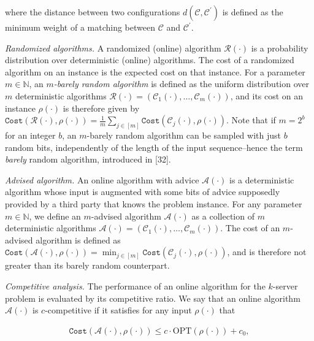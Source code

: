 where the distance between two configurations $d(\mathcal{C},\mathcal{C}^{\prime})$ is defined as the minimum weight of a matching between $\mathcal{C}$ and $\mathcal{C}^{\prime}$.\par




\emph{Randomized algorithms.} A randomized (online) algorithm $\mathcal{R}(\cdot)$ is a probability distribution over deterministic (online) algorithms. The cost of a randomized algorithm on an instance is the expected cost on that instance. For a parameter $m\in\mathbb{N}$, an \emph{$m$-barely random algorithm} is defined as the uniform distribution over $m$ deterministic algorithms $\mathcal{R}(\cdot)=(\mathcal{C}_{1}(\cdot),\dots,\mathcal{C}_{m}(\cdot))$, and its cost on an instance $\rho(\cdot)$ is therefore given by ${\texttt{Cost}}(\mathcal{R}(\cdot),\rho(\cdot))=\frac{1}{m}\sum_{j\in[m]}{\texttt{Cost}}(\mathcal{C}_{j}(\cdot),\rho(\cdot))$. Note that if $m=2^{b}$ for an integer $b$, an $m$-barely random algorithm can be sampled with just $b$ random bits, independently of the length of the input sequence–hence the term \emph{barely} random algorithm, introduced in [32].\par




\emph{Advised algorithm.} An online algorithm with advice $\mathcal{A}(\cdot)$ is a deterministic algorithm whose input is augmented with some bits of advice supposedly provided by a third party that knows the problem instance.
For any parameter $m\in\mathbb{N}$, we define an $m$-advised algorithm $\mathcal{A}(\cdot)$ as a collection of $m$ deterministic algorithms $\mathcal{A}(\cdot)=(\mathcal{C}_{1}(\cdot),\dots,\mathcal{C}_{m}(\cdot))$. The cost of an $m$-advised algorithm is defined as
${\texttt{Cost}}(\mathcal{A}(\cdot),\rho(\cdot))=\min_{j\in[m]}{\texttt{Cost}}(\mathcal{C}_{j}(\cdot),\rho(\cdot))$, and is therefore not greater than its barely random counterpart.\par




\emph{Competitive analysis.} The performance of an online algorithm for the $k$-server problem is evaluated by its competitive ratio. We say that an online algorithm $\mathcal{A}(\cdot)$ is $c$-competitive if it satisfies for any input $\rho(\cdot)$ that\par


\[\begin{gathered}
{\texttt{Cost}}(\mathcal{A}(\cdot),\rho(\cdot))\leq c\cdot\text{OPT}(\rho(\cdot))+c_{0},
\end{gathered}\]


